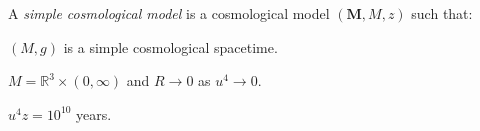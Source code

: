 A \textit{simple cosmological model} is a cosmological model $(\mathbf{M}, M, z)$ such that:

 $(M, g)$ is a simple cosmological spacetime.

 $M = \mathbb{R}^3 \times (0, \infty)$ and $R \rightarrow 0$ as $u^4 \rightarrow 0$.

 $u^4 z = 10^{10}$ years.
